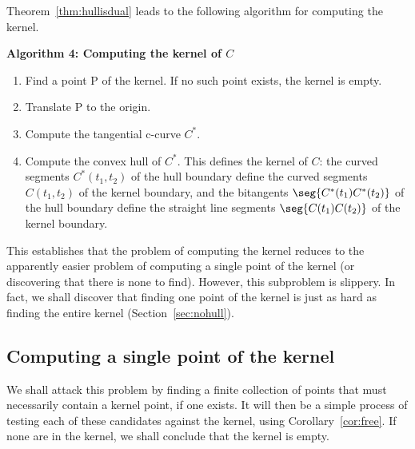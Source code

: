 \documentclass[12pt]{article}
\begin{document}

Theorem~\ref{thm:hullisdual} leads to the following algorithm for computing
the kernel.
	
\vspace{.2in}

\centerline{{\bf Algorithm 4: Computing the kernel of $C$}}

\begin{enumerate}
\item 	Find a point P of the kernel.  If no such point exists, 
	the kernel is empty.
\item   Translate P to the origin.
\item	Compute the tangential c-curve $C^*$.
\item	Compute the convex hull of $C^*$.
	This defines the kernel of $C$:
	the curved segments $C^*(t_1,t_2)$ of the hull boundary define
	the curved segments $C(t_1,t_2)$ of the kernel boundary,
	and the bitangents $\seg{C^*(t_1)C^*(t_2)}$ of the hull boundary 
	define the straight line segments $\seg{C(t_1)C(t_2)}$ of the
	kernel boundary.
\end{enumerate}



This establishes that the problem of computing the kernel reduces to the apparently
easier problem of computing a single point of the kernel
(or discovering that there is none to find).
However, this subproblem is slippery.
In fact, we shall discover that finding one point of the kernel
is just as hard as finding the entire kernel (Section~\ref{sec:nohull}).


\subsection{Computing a single point of the kernel}
\label{sec:candidate}

We shall attack this problem by finding 
a finite collection of points that must necessarily contain
a kernel point, if one exists.
It will then be a simple process of testing each of these candidates against
the kernel, using Corollary~\ref{cor:free}.
If none are in the kernel, we shall conclude that the kernel is empty.
\end{document}
